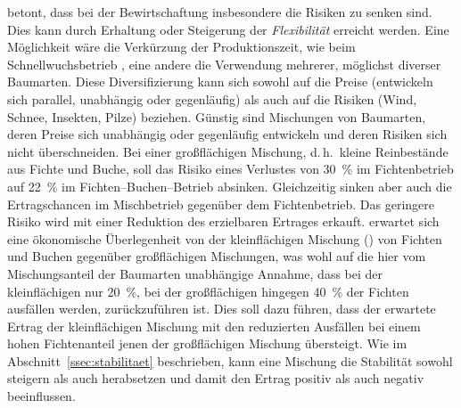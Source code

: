 \documentclass[twocolumn, paper=a4, fontsize=10pt, bibliography=totoc, index=totoc]{scrartcl}
\begin{document}
\citet{knoke2007mischwald} betont, dass bei der Bewirtschaftung
insbesondere die Risiken zu senken sind. Dies kann durch Erhaltung
oder Steigerung der \emph{Flexibilität} erreicht werden. Eine
Möglichkeit wäre die Verkürzung der Produktionszeit, wie beim
Schnellwuchsbetrieb
\citep{bohdanecky1890worlik,schiffel1904Wuchsgestze,schwappach1905durchforstungFichte,eulefeld1922schnellwuchs,gehrhardt1924StammzahlhaltungInJungenFichtenbestaenden},
eine andere die Verwendung mehrerer, möglichst diverser
Baumarten. Diese Diversifizierung kann sich sowohl auf die Preise
(entwickeln sich parallel, unabhängig oder gegenläufig) als auch auf
die Risiken (Wind, Schnee, Insekten, Pilze) beziehen. Günstig sind
Mischungen von Baumarten, deren Preise sich unabhängig oder
gegenläufig entwickeln und deren Risiken sich nicht überschneiden. Bei
einer großflächigen Mischung, d.\,h.\ kleine Reinbestände aus Fichte
und Buche, soll das Risiko eines Verlustes von \qty{30}{\percent} im Fichtenbetrieb
auf \qty{22}{\percent} im Fichten--Buchen--Betrieb absinken. Gleichzeitig sinken
aber auch die Ertragschancen im Mischbetrieb gegenüber dem
Fichtenbetrieb. Das geringere Risiko wird mit einer Reduktion des
erzielbaren Ertrages erkauft. \citet{knoke2007mischwaldB} erwartet sich
eine ökonomische Überlegenheit von der kleinflächigen Mischung
() von Fichten und Buchen gegenüber großflächigen
Mischungen, was wohl auf die hier vom Mischungsanteil der Baumarten
unabhängige Annahme, dass bei der kleinflächigen nur \qty{20}{\percent}, bei der
großflächigen hingegen \qty{40}{\percent} der Fichten ausfällen werden,
zurückzuführen ist. Dies soll dazu führen, dass der erwartete Ertrag
der kleinflächigen Mischung mit den reduzierten Ausfällen bei einem
hohen Fichtenanteil jenen der großflächigen Mischung übersteigt. Wie
im Abschnitt~\ref{ssec:stabilitaet} beschrieben, kann eine Mischung
die Stabilität sowohl steigern als auch herabsetzen und damit den
Ertrag positiv als auch negativ beeinflussen.
\end{document}
